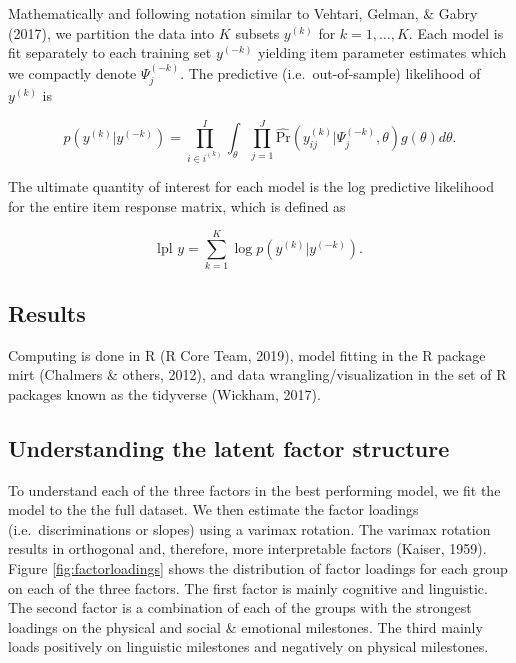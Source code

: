 \documentclass[10pt, letterpaper]{article}
\begin{document}
Mathematically and following notation similar to Vehtari, Gelman, \&
Gabry (2017), we partition the data into \(K\) subsets \(y^{(k)}\) for
\(k = 1, \ldots, K\). Each model is fit separately to each training set
\(y^{(-k)}\) yielding item parameter estimates which we compactly denote
\(\Psi_j^{(-k)}\). The predictive (i.e.~out-of-sample) likelihood of
\(y^{(k)}\) is

\[
p(y^{(k)} | y^{(-k)}) = \prod_{i \in i^{(k)}}^{I} \int_\theta \prod_{j=1}^{J} \hat{\text{Pr}}(y_{ij}^{(k)} | \Psi_j^{(-k)}, \theta) g(\theta)d\theta.
\]

The ultimate quantity of interest for each model is the log predictive
likelihood for the entire item response matrix, which is defined as

\[
\text{lpl } y = \sum_{k = 1}^{K} \log p(y^{(k)} | y^{(-k)}).
\]

\hypertarget{results}{%
\subsection{Results}\label{results}}

Computing is done in R (R Core Team, 2019), model fitting in the R
package mirt (Chalmers \& others, 2012), and data
wrangling/visualization in the set of R packages known as the tidyverse
(Wickham, 2017).

\hypertarget{understanding-the-latent-factor-structure}{%
\subsection{Understanding the latent factor
structure}\label{understanding-the-latent-factor-structure}}

To understand each of the three factors in the best performing model, we
fit the model to the the full dataset. We then estimate the factor
loadings (i.e.~discriminations or slopes) using a varimax rotation. The
varimax rotation results in orthogonal and, therefore, more
interpretable factors (Kaiser, 1959). Figure \ref{fig:factorloadings}
shows the distribution of factor loadings for each group on each of the
three factors. The first factor is mainly cognitive and linguistic. The
second factor is a combination of each of the groups with the strongest
loadings on the physical and social \& emotional milestones. The third
mainly loads positively on linguistic milestones and negatively on
physical milestones.
\end{document}
